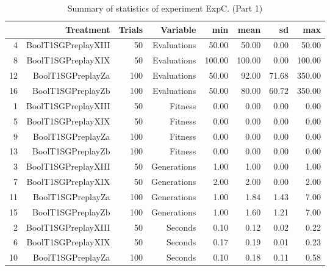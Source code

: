 \begin{table}[ht]
\centering
\begin{tabular}{rrrrrrrr}
  \hline
 & Treatment & Trials & Variable & min & mean & sd & max \\ 
  \hline
4 & BoolT1SGPreplayXIII &  50 & Evaluations & 50.00 & 50.00 & 0.00 & 50.00 \\ 
  8 & BoolT1SGPreplayXIX &  50 & Evaluations & 100.00 & 100.00 & 0.00 & 100.00 \\ 
  12 & BoolT1SGPreplayZa & 100 & Evaluations & 50.00 & 92.00 & 71.68 & 350.00 \\ 
  16 & BoolT1SGPreplayZb & 100 & Evaluations & 50.00 & 80.00 & 60.72 & 350.00 \\ 
  1 & BoolT1SGPreplayXIII &  50 & Fitness & 0.00 & 0.00 & 0.00 & 0.00 \\ 
  5 & BoolT1SGPreplayXIX &  50 & Fitness & 0.00 & 0.00 & 0.00 & 0.00 \\ 
  9 & BoolT1SGPreplayZa & 100 & Fitness & 0.00 & 0.00 & 0.00 & 0.00 \\ 
  13 & BoolT1SGPreplayZb & 100 & Fitness & 0.00 & 0.00 & 0.00 & 0.00 \\ 
  3 & BoolT1SGPreplayXIII &  50 & Generations & 1.00 & 1.00 & 0.00 & 1.00 \\ 
  7 & BoolT1SGPreplayXIX &  50 & Generations & 2.00 & 2.00 & 0.00 & 2.00 \\ 
  11 & BoolT1SGPreplayZa & 100 & Generations & 1.00 & 1.84 & 1.43 & 7.00 \\ 
  15 & BoolT1SGPreplayZb & 100 & Generations & 1.00 & 1.60 & 1.21 & 7.00 \\ 
  2 & BoolT1SGPreplayXIII &  50 & Seconds & 0.10 & 0.12 & 0.02 & 0.22 \\ 
  6 & BoolT1SGPreplayXIX &  50 & Seconds & 0.17 & 0.19 & 0.01 & 0.23 \\ 
  10 & BoolT1SGPreplayZa & 100 & Seconds & 0.10 & 0.18 & 0.11 & 0.58 \\ 
   \hline
\end{tabular}
\caption{Summary of statistics of experiment ExpC. (Part 1)} 
\end{table}
